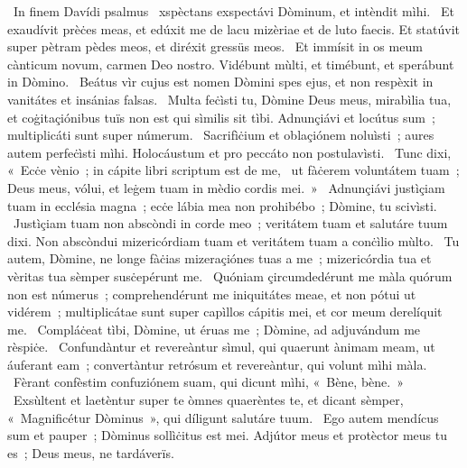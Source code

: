 {~In finem Davídi psalmus}
{%
~xspèctans exspectávi Dòminum, et intèndit mìhi. 
~Et exaudívit prèċes meas, et edúxit me de lacu mizèriae et de luto faecis. Et statúvit super pètram pèdes meos, et diréxit gressüs meos. 
~Et immísit in os meum cànticum novum, carmen Deo nostro. Vidébunt mùlti, et timébunt, et sperábunt in Dòmino. 
~Beátus vìr cujus est nomen Dòmini spes ejus, et non respèxit in vanitátes et insánias falsas. 
~Multa feċìsti tu, Dòmine Deus meus, mirabìlia tua, et coġitaçiónibus tuïs non est qui sìmilis sit tìbi. Adnunçiávi et locútus sum~; multiplicáti sunt super númerum. 
~Sacrifìċium et oblaçiónem noluìsti~; aures autem perfeċìsti mìhi. Holocáustum et pro peccáto non postulavìsti. 
~Tunc dixi, «~Ecċe vènio~; in cápite libri scriptum est de me, 
~ut fàċerem voluntátem tuam~; Deus meus, vólui, et leġem tuam in mèdio cordis mei.~»
~Adnunçiávi justìçiam tuam in ecclésia magna~; ecċe lábia mea non prohibébo~; Dòmine, tu scivìsti. 
~Justìçiam tuam non abscòndi in corde meo~; veritátem tuam et salutáre tuum dixi. Non abscòndui mizericórdiam tuam et veritátem tuam a conċìlio mùlto. 
~Tu autem, Dòmine, ne longe fàċias mizeraçiónes tuas a me~; mizericórdia tua et vèritas tua sèmper susċepérunt me. 
~Quóniam çircumdedérunt me màla quórum non est númerus~; comprehendérunt me iniquitátes meae, et non pótui ut vidérem~; multiplicátae sunt super capìllos cápitis mei, et cor meum derelíquit me. 
~Compláċeat tìbi, Dòmine, ut éruas me~; Dòmine, ad adjuvándum me rèspiċe. 
~Confundàntur et revereàntur sìmul, qui quaerunt ànimam meam, ut áuferant eam~; convertàntur retrósum et revereàntur, qui volunt mìhi màla. 
~Fèrant confèstim confuziónem suam, qui dicunt mìhi, «~Bène, bène.~»
~Exsùltent et laetèntur super te òmnes quaerèntes te, et dicant sèmper, «~Magnificétur Dòminus~», qui díligunt salutáre tuum. 
~Ego autem mendícus sum et pauper~; Dòminus sollìċitus est mei. Adjútor meus et protèctor meus tu es~; Deus meus, ne  tardáverïs. 
}
